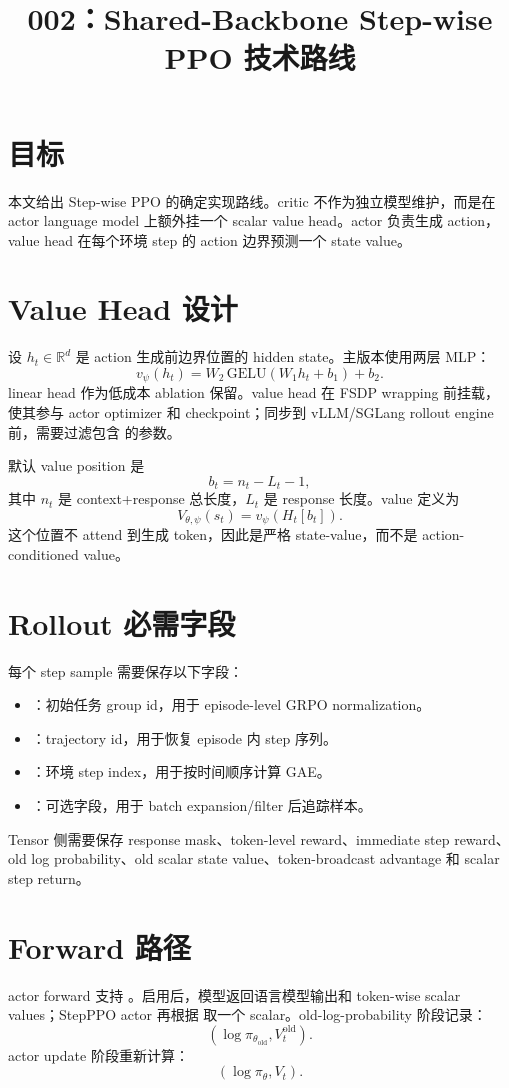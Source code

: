 \documentclass[10pt]{ctexart}
\title{002：Shared-Backbone Step-wise PPO 技术路线}
\author{}
\date{}
\begin{document}
\maketitle
\vspace{-1.2em}

\section*{目标}
本文给出 Step-wise PPO 的确定实现路线。critic 不作为独立模型维护，而是在 actor language model 上额外挂一个 scalar value head。actor 负责生成 action，value head 在每个环境 step 的 action 边界预测一个 state value。

\section*{Value Head 设计}
设 $h_t\in\mathbb{R}^d$ 是 action 生成前边界位置的 hidden state。主版本使用两层 MLP：
\[
v_\psi(h_t)=W_2\,\mathrm{GELU}(W_1h_t+b_1)+b_2.
\]
linear head 作为低成本 ablation 保留。value head 在 FSDP wrapping 前挂载，使其参与 actor optimizer 和 checkpoint；同步到 vLLM/SGLang rollout engine 前，需要过滤包含  的参数。

默认 value position 是
\[
b_t = n_t - L_t - 1,
\]
其中 $n_t$ 是 context+response 总长度，$L_t$ 是 response 长度。value 定义为
\[
V_{\theta,\psi}(s_t)=v_\psi(H_t[b_t]).
\]
这个位置不 attend 到生成 token，因此是严格 state-value，而不是 action-conditioned value。

\section*{Rollout 必需字段}
每个 step sample 需要保存以下字段：
\begin{itemize}
\item {}：初始任务 group id，用于 episode-level GRPO normalization。
\item {}：trajectory id，用于恢复 episode 内 step 序列。
\item {}：环境 step index，用于按时间顺序计算 GAE。
\item {}：可选字段，用于 batch expansion/filter 后追踪样本。
\end{itemize}
Tensor 侧需要保存 response mask、token-level reward、immediate step reward、old log probability、old scalar state value、token-broadcast advantage 和 scalar step return。

\section*{Forward 路径}
actor forward 支持 。启用后，模型返回语言模型输出和 token-wise scalar values；StepPPO actor 再根据  取一个 scalar。old-log-probability 阶段记录：
\[
(\log\pi_{\theta_{\mathrm{old}}}, V^{\mathrm{old}}_t).
\]
actor update 阶段重新计算：
\[
(\log\pi_{\theta}, V_t).
\]
\end{document}
